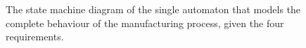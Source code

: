 \begin{sidewaysfigure}
  \begin{figure}[H]\centering
    \scalebox{0.8}{}
    \caption{The state machine diagram of the single automaton that models the
      complete behaviour of the manufacturing process, given the four
      requirements.}
    \label{fig:fsm_3}
  \end{figure}
\end{sidewaysfigure}
